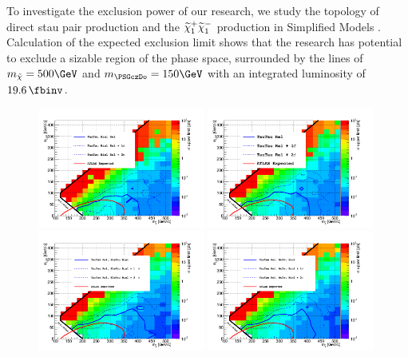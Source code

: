 To investigate the exclusion power of our research, we study the topology of direct stau pair production and  the $\widetilde{\chi}_{1}^{+}\widetilde{\chi}_{1}^{-}$ production in Simplified Models \cite{alves:sms}. 
Calculation of the expected exclusion limit shows that  
the research has potential to exclude 
a sizable region of the phase space, surrounded by the lines of $m_{\tilde{\chi}} = 500\GeV$ and $m_{\PSGczDo} = 150\GeV$ with an integrated luminosity of $19.6\,\fbinv$.


\begin{linenomath}
\begin{figure}[h]
\centering
\includegraphics[width=0.49\textwidth,keepaspectratio=true]{StatisticsFig/NewFigs/TauTau_Bin1Rel.png}
\includegraphics[width=0.49\textwidth,keepaspectratio=true]{StatisticsFig/NewFigs/TauTau_Bin1Rel_Bin2.png}
\includegraphics[width=0.49\textwidth,keepaspectratio=true]{StatisticsFig/NewFigs/TauTau_EleTauBin1.png}
\includegraphics[width=0.49\textwidth,keepaspectratio=true]{StatisticsFig/NewFigs/TauTau_MuTauBin1.png}
\caption{}
\label{fig:limit_bins}
\end{figure}
\end{linenomath}

